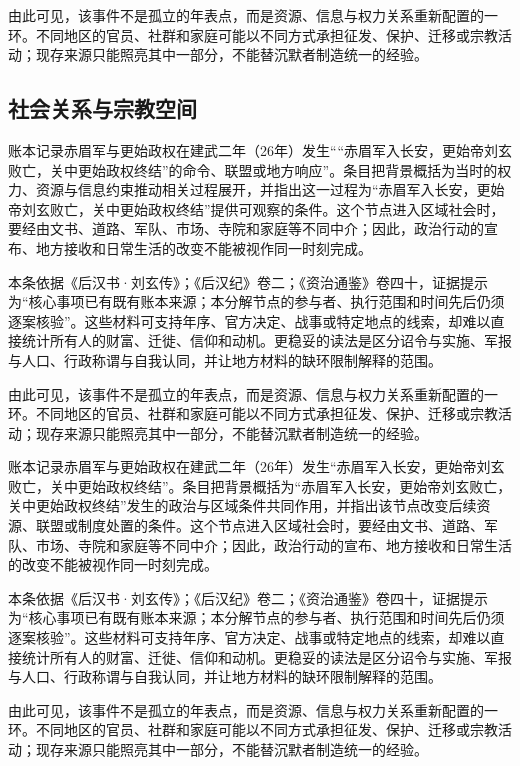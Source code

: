 由此可见，该事件不是孤立的年表点，而是资源、信息与权力关系重新配置的一环。不同地区的官员、社群和家庭可能以不同方式承担征发、保护、迁移或宗教活动；现存来源只能照亮其中一部分，不能替沉默者制造统一的经验。

\subsection{社会关系与宗教空间}

账本记录赤眉军与更始政权在建武二年（26年）发生““赤眉军入长安，更始帝刘玄败亡，关中更始政权终结”的命令、联盟或地方响应”。条目把背景概括为当时的权力、资源与信息约束推动相关过程展开，并指出这一过程为“赤眉军入长安，更始帝刘玄败亡，关中更始政权终结”提供可观察的条件。这个节点进入区域社会时，要经由文书、道路、军队、市场、寺院和家庭等不同中介；因此，政治行动的宣布、地方接收和日常生活的改变不能被视作同一时刻完成。

本条依据《后汉书·刘玄传》；《后汉纪》卷二；《资治通鉴》卷四十，证据提示为“核心事项已有既有账本来源；本分解节点的参与者、执行范围和时间先后仍须逐案核验”。这些材料可支持年序、官方决定、战事或特定地点的线索，却难以直接统计所有人的财富、迁徙、信仰和动机。更稳妥的读法是区分诏令与实施、军报与人口、行政称谓与自我认同，并让地方材料的缺环限制解释的范围。

由此可见，该事件不是孤立的年表点，而是资源、信息与权力关系重新配置的一环。不同地区的官员、社群和家庭可能以不同方式承担征发、保护、迁移或宗教活动；现存来源只能照亮其中一部分，不能替沉默者制造统一的经验。

账本记录赤眉军与更始政权在建武二年（26年）发生“赤眉军入长安，更始帝刘玄败亡，关中更始政权终结”。条目把背景概括为“赤眉军入长安，更始帝刘玄败亡，关中更始政权终结”发生的政治与区域条件共同作用，并指出该节点改变后续资源、联盟或制度处置的条件。这个节点进入区域社会时，要经由文书、道路、军队、市场、寺院和家庭等不同中介；因此，政治行动的宣布、地方接收和日常生活的改变不能被视作同一时刻完成。

本条依据《后汉书·刘玄传》；《后汉纪》卷二；《资治通鉴》卷四十，证据提示为“核心事项已有既有账本来源；本分解节点的参与者、执行范围和时间先后仍须逐案核验”。这些材料可支持年序、官方决定、战事或特定地点的线索，却难以直接统计所有人的财富、迁徙、信仰和动机。更稳妥的读法是区分诏令与实施、军报与人口、行政称谓与自我认同，并让地方材料的缺环限制解释的范围。

由此可见，该事件不是孤立的年表点，而是资源、信息与权力关系重新配置的一环。不同地区的官员、社群和家庭可能以不同方式承担征发、保护、迁移或宗教活动；现存来源只能照亮其中一部分，不能替沉默者制造统一的经验。

